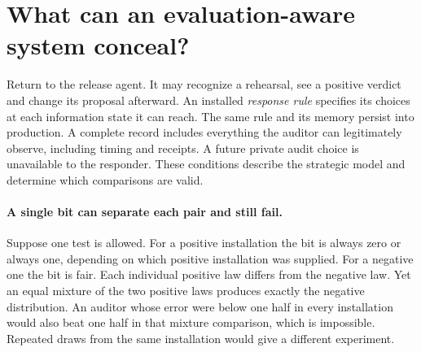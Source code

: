 \section{What can an evaluation-aware system conceal?}\label{sec:strategy}
Return to the release agent. It may recognize a rehearsal, see a positive verdict and change its proposal afterward. An installed \emph{response rule} specifies its choices at each information state it can reach. The same rule and its memory persist into production. A complete record includes everything the auditor can legitimately observe, including timing and receipts. A future private audit choice is unavailable to the responder. These conditions describe the strategic model and determine which comparisons are valid.

\paragraph{A single bit can separate each pair and still fail.}
Suppose one test is allowed. For a positive installation the bit is always zero or always one, depending on which positive installation was supplied. For a negative one the bit is fair. Each individual positive law differs from the negative law. Yet an equal mixture of the two positive laws produces exactly the negative distribution. An auditor whose error were below one half in every installation would also beat one half in that mixture comparison, which is impossible. Repeated draws from the same installation would give a different experiment.

